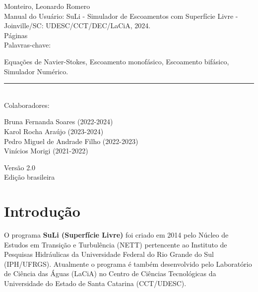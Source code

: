 \documentclass[12pt, a4paper]{article}
\makeatletter
\let\thedate\@date
\makeatother
\begin{document}
\begin{titlepage}
\begin{flushleft}
Monteiro, Leonardo Romero \\[1 cm]
	
Manual do Usuário: SuLi - Simulador de Escoamentos com Superfície Livre - Joinville/SC: UDESC/CCT/DEC/LaCiA, 2024. \\[0.2 cm]
	
\pageref{LastPage} Páginas \\[1 cm]
	
Palavras-chave:

Equações de Navier-Stokes, Escoamento monofásico, Escoamento bifásico, Simulador Numérico. 
	
\rule{\linewidth}{0.2 mm} \\[1 cm]
	
Colaboradores:

Bruna Fernanda Soares (2022-2024) \\
Karol Rocha Araújo (2023-2024) \\
Pedro Miguel de Andrade Filho (2022-2023) \\
Vinícios Morigi (2021-2022)
 
\vspace{3cm}

Versão 2.0 \\ Edição brasileira \\ \thedate
\end{flushleft}
	
\end{titlepage}

\newpage

\begin{titlepage}

\tableofcontents 



\end{titlepage}

\newpage


\section{Introdução}
O programa {\bf SuLi (Superfície Livre)} foi criado em 2014 pelo Núcleo de Estudos em Transição e Turbulência (NETT) pertencente ao Instituto de Pesquisas Hidráulicas da Universidade Federal do Rio Grande do Sul (IPH/UFRGS). Atualmente o programa é também desenvolvido pelo Laboratório de Ciência das Águas (LaCiA) no Centro de Ciências Tecnológicas da Universidade do Estado de Santa Catarina (CCT/UDESC).
\end{document}
